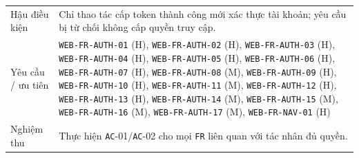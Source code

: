 \begin{longtable}{@{}P{0.20000\SRSWidth}P{0.80000\SRSWidth}@{}}
Hậu điều kiện & Chỉ thao tác cấp token thành công mới xác thực tài khoản; yêu cầu bị từ chối không cấp quyền truy cập. \\[3pt]
Yêu cầu /\allowbreak{} ưu tiên & \texttt{WEB-\allowbreak{}FR-\allowbreak{}AUTH-\allowbreak{}01} (H), \texttt{WEB-\allowbreak{}FR-\allowbreak{}AUTH-\allowbreak{}02} (H), \texttt{WEB-\allowbreak{}FR-\allowbreak{}AUTH-\allowbreak{}03} (H), \texttt{WEB-\allowbreak{}FR-\allowbreak{}AUTH-\allowbreak{}04} (H), \texttt{WEB-\allowbreak{}FR-\allowbreak{}AUTH-\allowbreak{}05} (H), \texttt{WEB-\allowbreak{}FR-\allowbreak{}AUTH-\allowbreak{}06} (H), \texttt{WEB-\allowbreak{}FR-\allowbreak{}AUTH-\allowbreak{}07} (H), \texttt{WEB-\allowbreak{}FR-\allowbreak{}AUTH-\allowbreak{}08} (M), \texttt{WEB-\allowbreak{}FR-\allowbreak{}AUTH-\allowbreak{}09} (H), \texttt{WEB-\allowbreak{}FR-\allowbreak{}AUTH-\allowbreak{}10} (H), \texttt{WEB-\allowbreak{}FR-\allowbreak{}AUTH-\allowbreak{}11} (M), \texttt{WEB-\allowbreak{}FR-\allowbreak{}AUTH-\allowbreak{}12} (H), \texttt{WEB-\allowbreak{}FR-\allowbreak{}AUTH-\allowbreak{}13} (H), \texttt{WEB-\allowbreak{}FR-\allowbreak{}AUTH-\allowbreak{}14} (M), \texttt{WEB-\allowbreak{}FR-\allowbreak{}AUTH-\allowbreak{}15} (M), \texttt{WEB-\allowbreak{}FR-\allowbreak{}AUTH-\allowbreak{}16} (M), \texttt{WEB-\allowbreak{}FR-\allowbreak{}AUTH-\allowbreak{}17} (M), \texttt{WEB-\allowbreak{}FR-\allowbreak{}NAV-\allowbreak{}01} (H) \\[3pt]
Nghiệm thu & Thực hiện \texttt{AC}-01/\allowbreak{}\texttt{AC}-02 cho mọi \texttt{FR} liên quan với tác nhân đủ quyền. \\[3pt]
\end{longtable}
\endgroup

